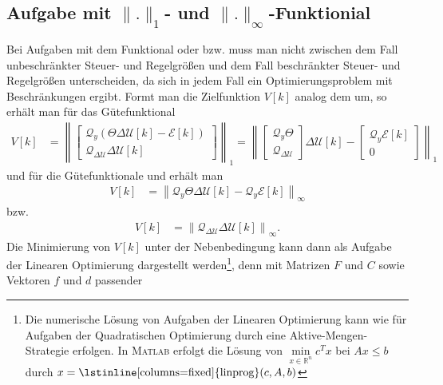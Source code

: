 \subsection{Aufgabe mit $\|.\|_1$- und $\|.\|_{\infty}$-Funktionial}
Bei Aufgaben mit dem Funktional  oder  bzw.  muss
man nicht zwischen dem Fall unbeschränkter Steuer- und Regelgrößen und dem Fall beschränkter Steuer- und Regelgrößen unterscheiden, da sich in jedem Fall ein Optimierungsproblem mit
Beschränkungen ergibt. Formt man die Zielfunktion $V[k]$ analog dem  um, so erhält man für das Gütefunktional
\begin{align}
V[k] & = \left\| \begin{bmatrix}
\mathcal{Q}_y\left( \Theta\Delta\mathcal{U}[k]-\mathcal{E}[k] \right)\\ \mathcal{Q}_{\Delta\mathcal{U}}\Delta\mathcal{U}[k]
\end{bmatrix} \right\|_1 = \left\| \begin{bmatrix}
\mathcal{Q}_y\Theta\\ \mathcal{Q}_{\Delta\mathcal{U}}
\end{bmatrix}\Delta\mathcal{U}[k]-\begin{bmatrix}
\mathcal{Q}_y\mathcal{E}[k]\\ 0
\end{bmatrix} \right\|_1
\end{align}
und für die Gütefunktionale  und  erhält man
\begin{align}
	V[k] & = \left\| \mathcal{Q}_y\Theta\Delta\mathcal{U}[k]-\mathcal{Q}_y\mathcal{E}[k] \right\|_{\infty}
\end{align}
bzw.
\begin{align}
	V[k] & = \left\| \mathcal{Q}_{\Delta\mathcal{U}}\Delta\mathcal{U}[k] \right\|_{\infty}.
\end{align}
Die Minimierung von $V[k]$ unter der Nebenbedingung  kann dann als Aufgabe der Linearen Optimierung dargestellt werden\footnote{Die numerische
Lösung von Aufgaben der Linearen Optimierung kann wie für Aufgaben der Quadratischen Optimierung durch eine Aktive-Mengen-Strategie erfolgen. In \textsc{Matlab} erfolgt die Lösung
von $\min\limits_{x\in\mathbb{R}^n}c^Tx$ bei $Ax\le b$ durch $x=\text{\lstinline[columns=fixed]{linprog}}(c,A,b)$}, denn mit Matrizen $F$ und $C$ sowie Vektoren $f$ und $d$ passender
